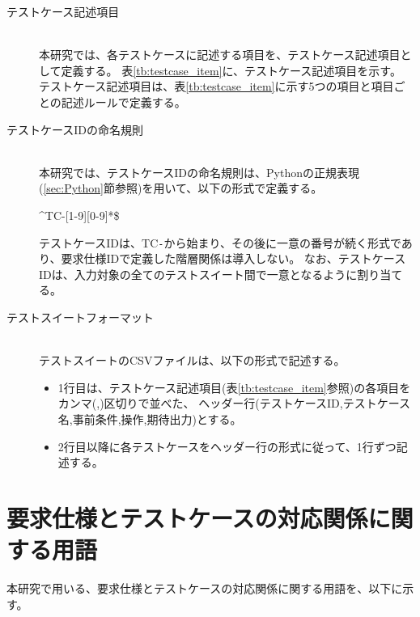 \begin{description}
    \item[テストケース記述項目]\mbox{}\\
    本研究では、各テストケースに記述する項目を、テストケース記述項目として定義する。
    表\ref{tb:testcase_item}に、テストケース記述項目を示す。
    テストケース記述項目は、表\ref{tb:testcase_item}に示す5つの項目と項目ごとの記述ルールで定義する。

    \item[テストケースIDの命名規則]\mbox{}\\
    本研究では、テストケースIDの命名規則は、Pythonの正規表現(\ref{sec:Python}節参照)を用いて、以下の形式で定義する。

    \begin{center}
        \textasciicircum{}TC-[1-9][0-9]*\$
    \end{center}

    テストケースIDは、TC\texttt{-}から始まり、その後に一意の番号が続く形式であり、要求仕様IDで定義した階層関係は導入しない。
    なお、テストケースIDは、入力対象の全てのテストスイート間で一意となるように割り当てる。

    \item[テストスイートフォーマット]\mbox{}\\
    テストスイートのCSVファイルは、以下の形式で記述する。
    \begin{itemize}
        \item 1行目は、テストケース記述項目(表\ref{tb:testcase_item}参照)の各項目をカンマ(,)区切りで並べた、
        ヘッダー行(テストケースID,テストケース名,事前条件,操作,期待出力)とする。
        \item 2行目以降に各テストケースをヘッダー行の形式に従って、1行ずつ記述する。
    \end{itemize}
\end{description}

\section{要求仕様とテストケースの対応関係に関する用語}\label{sec:words}
本研究で用いる、要求仕様とテストケースの対応関係に関する用語を、以下に示す。

